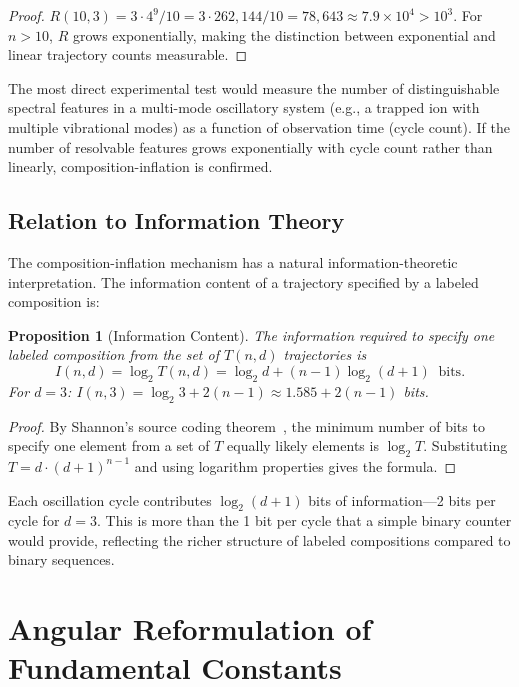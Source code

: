 \documentclass[twocolumn,10pt,a4paper]{article}
\newtheorem{proposition}[theorem]{Proposition}
\theoremstyle{definition}
\theoremstyle{remark}
\begin{document}
\begin{proof}
$R(10,3) = 3 \cdot 4^9 / 10 = 3 \cdot 262{,}144 / 10 = 78{,}643 \approx 7.9 \times 10^4 > 10^3$. For $n > 10$, $R$ grows exponentially, making the distinction between exponential and linear trajectory counts measurable.
\end{proof}

The most direct experimental test would measure the number of distinguishable spectral features in a multi-mode oscillatory system (e.g., a trapped ion with multiple vibrational modes) as a function of observation time (cycle count). If the number of resolvable features grows exponentially with cycle count rather than linearly, composition-inflation is confirmed.

\subsection{Relation to Information Theory}

The composition-inflation mechanism has a natural information-theoretic interpretation. The information content of a trajectory specified by a labeled composition is:

\begin{proposition}[Information Content]
\label{prop:info}
The information required to specify one labeled composition from the set of $T(n,d)$ trajectories is
\begin{equation}
I(n,d) = \log_2 T(n,d) = \log_2 d + (n-1) \log_2(d+1) \;\;\text{bits}.
\end{equation}
For $d = 3$: $I(n,3) = \log_2 3 + 2(n-1) \approx 1.585 + 2(n-1)$ bits.
\end{proposition}

\begin{proof}
By Shannon's source coding theorem~\cite{shannon1948}, the minimum number of bits to specify one element from a set of $T$ equally likely elements is $\log_2 T$. Substituting $T = d \cdot (d+1)^{n-1}$ and using logarithm properties gives the formula.
\end{proof}

Each oscillation cycle contributes $\log_2(d+1)$ bits of information---2 bits per cycle for $d = 3$. This is more than the 1 bit per cycle that a simple binary counter would provide, reflecting the richer structure of labeled compositions compared to binary sequences.


\section{Angular Reformulation of Fundamental Constants}
\label{sec:angular_constants}
\end{document}
